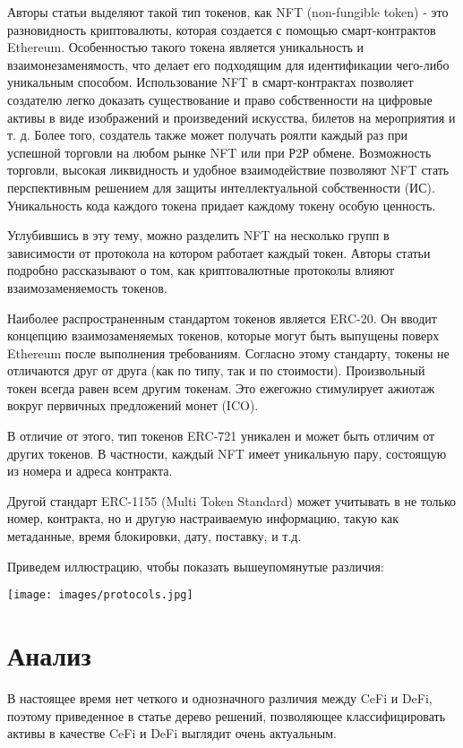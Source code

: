 \documentclass[14pt, a4paper]{extarticle}
\begin{document}
Авторы статьи \cite{ante2021influence} выделяют такой тип токенов, как NFT (non-fungible token) - это разновидность криптовалюты, которая создается с помощью
смарт-контрактов Ethereum. Особенностью такого токена является уникальность и взаимонезаменямость, что делает его подходящим для идентификации чего-либо уникальным способом. Использование NFT
в смарт-контрактах позволяет создателю легко доказать существование
и право собственности на цифровые активы в виде изображений и произведений искусства, билетов на мероприятия и т. д.
 Более того, создатель также может получать роялти каждый раз при
успешной торговли на любом рынке NFT или при Р2Р обмене. 
Возможность торговли, высокая ликвидность и удобное взаимодействие позволяют NFT стать перспективным решением для защиты интеллектуальной собственности (ИС). Уникальность кода каждого токена придает каждому токену особую ценность.

Углубившись в эту тему, можно разделить NFT на несколько групп в зависимости от протокола на котором работает каждый токен. Авторы статьи \cite{ante2022non} подробно рассказывают о том, как криптовалютные протоколы влияют взаимозаменяемость токенов.

Наиболее распространенным стандартом токенов является ERC-20. Он вводит концепцию взаимозаменяемых токенов, которые могут быть выпущены поверх Ethereum после выполнения
требованиям. Согласно этому стандарту, токены не отличаются друг от друга (как по типу, так и по стоимости). Произвольный токен всегда равен всем другим
токенам. Это ежегожно стимулирует ажиотаж вокруг первичных предложений монет (ICO).

В отличие от этого, тип токенов ERC-721 уникален и может быть отличим от других токенов. В частности, каждый 
NFT имеет уникальную пару, состоящую из номера и адреса контракта. 

Другой стандарт ERC-1155 (Multi Token Standard) может учитывать в не только номер, контракта, но и другую
настраиваемую информацию, такую как метаданные, время блокировки, дату, поставку, и т.д.

Приведем иллюстрацию, чтобы показать
 вышеупомянутые различия:
 \vspace{0.5em}

\texttt{[image: images/protocols.jpg]}

\section*{Анализ}\par
В настоящее время нет четкого и однозначного различия между CeFi и DeFi, поэтому приведенное в статье\cite{mukhopadhyay2018ethereum} дерево решений, позволяющее классифицировать активы в качестве  CeFi и DeFi выглядит очень актуальным.
\end{document}
